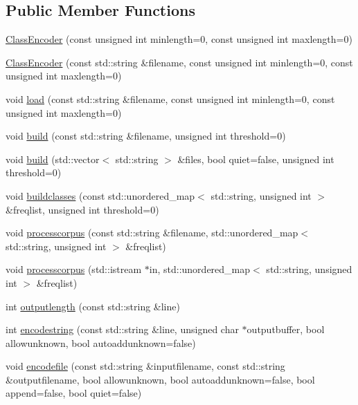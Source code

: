 \subsection*{Public Member Functions}
\begin{DoxyCompactItemize}
\item 
\hyperlink{classClassEncoder_aacc3de280c20145195eb0218b6111c0a}{Class\+Encoder} (const unsigned int minlength=0, const unsigned int maxlength=0)
\item 
\hyperlink{classClassEncoder_ad45c22282d9cdbf5bc3b63529f104a82}{Class\+Encoder} (const std\+::string \&filename, const unsigned int minlength=0, const unsigned int maxlength=0)
\item 
void \hyperlink{classClassEncoder_a154967c8f5092155daff8f8d2e9614f9}{load} (const std\+::string \&filename, const unsigned int minlength=0, const unsigned int maxlength=0)
\item 
void \hyperlink{classClassEncoder_af2663b3a486786596aecbf1a70405f63}{build} (const std\+::string \&filename, unsigned int threshold=0)
\item 
void \hyperlink{classClassEncoder_a317e36914ad768d4673da8726b5bc748}{build} (std\+::vector$<$ std\+::string $>$ \&files, bool quiet=false, unsigned int threshold=0)
\item 
void \hyperlink{classClassEncoder_a50785ce05b8f24bdab3373a9abfe3418}{buildclasses} (const std\+::unordered\+\_\+map$<$ std\+::string, unsigned int $>$ \&freqlist, unsigned int threshold=0)
\item 
void \hyperlink{classClassEncoder_a1f24c785b8056dd0e4c19215687ff0e9}{processcorpus} (const std\+::string \&filename, std\+::unordered\+\_\+map$<$ std\+::string, unsigned int $>$ \&freqlist)
\item 
void \hyperlink{classClassEncoder_a517d86e528966a04d188e9a023f01ae6}{processcorpus} (std\+::istream $\ast$in, std\+::unordered\+\_\+map$<$ std\+::string, unsigned int $>$ \&freqlist)
\item 
int \hyperlink{classClassEncoder_a27a25d91e8e1a1412d905ae4d09ac9d5}{outputlength} (const std\+::string \&line)
\item 
int \hyperlink{classClassEncoder_af8a81b7f610ab91dc31db0c893c92321}{encodestring} (const std\+::string \&line, unsigned char $\ast$outputbuffer, bool allowunknown, bool autoaddunknown=false)
\item 
void \hyperlink{classClassEncoder_a2733c6eaab7304a53cfc63a10c3bbee3}{encodefile} (const std\+::string \&inputfilename, const std\+::string \&outputfilename, bool allowunknown, bool autoaddunknown=false, bool append=false, bool quiet=false)

\end{DoxyCompactItemize}
